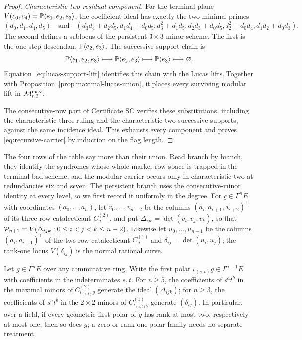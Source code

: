 \begin{proof}
\emph{Characteristic-two residual component.}
For the terminal plane \(V(c_0,c_4)=\mathbb P\langle e_1,e_2,e_3\rangle\), the
coefficient ideal has exactly the two minimal primes
\[
 (d_0,d_1,d_4,d_5)
 \quad\text{and}\quad
 (d_3d_4+d_2d_5,d_1d_4+d_0d_5,d_3^2+d_1d_5,
 d_2d_3+d_0d_5,d_2^2+d_0d_4,d_1d_2+d_0d_3).
\]
The second defines a sublocus of the persistent \(3\times3\)-minor scheme.
The first is the one-step descendant
\(\mathbb P\langle e_2,e_3\rangle\).  The successive support chain is
\[
 \mathbb P\langle e_1,e_2,e_3\rangle
 \longmapsto\mathbb P\langle e_2,e_3\rangle
 \longmapsto\mathbb P\langle e_3\rangle
 \longmapsto\varnothing .
\]
Equation~\eqref{eq:lucas-support-lift} identifies this chain with the Lucas
lifts.  Together with Proposition~\ref{prop:maximal-lucas-union}, it places
every surviving modular lift in \(\mathcal M^{\max}_{r,2}\).

The consecutive-row part of Certificate SC verifies these substitutions,
including the characteristic-three ruling and the
characteristic-two successive supports, against the same incidence ideal.
This exhausts every component and proves \eqref{eq:recursive-carrier} by
induction on the flag length.
\end{proof}

The four rows of the table say more than their union.  Read branch by
branch, they identify the syndromes whose whole marker row space is trapped
in the terminal bad scheme, and the modular carrier occurs only in
characteristic two at redundancies six and seven.  The persistent branch uses
the consecutive-minor identity at every level, so we first record it
uniformly in the degree.  For \(g\in\Gamma^nE\) with coordinates \((a_0,\ldots,a_n)\),
let \(v_0,\ldots,v_{n-2}\) be the columns \((a_i,a_{i+1},a_{i+2})^{\mathsf T}\)
of its three-row catalecticant \(C_g^{(2)}\), and put
\(\Delta_{ijk}=\det(v_i,v_j,v_k)\), so that
\(\mathcal P_{n+1}=V(\Delta_{ijk}:0\leq i<j<k\leq n-2)\).  Likewise let
\(u_0,\ldots,u_{n-1}\) be the columns \((a_i,a_{i+1})^{\mathsf T}\) of the
two-row catalecticant \(C^{(1)}_g\) and \(\delta_{ij}=\det(u_i,u_j)\); the
rank-one locus \(V(\delta_{ij})\) is the normal rational curve.

\begin{lemma}
\label{lem:polar-rank-two}%
%
Let \(g\in\Gamma^nE\) over any commutative ring.  Write the
first polar \(\iota_{(s,t)}g\in\Gamma^{n-1}E\) with coefficients in the
indeterminates \(s,t\).  For \(n\geq5\), the coefficients of \(s^at^b\) in
the maximal minors of \(C^{(2)}_{\iota_{(s,t)}g}\) generate the ideal
\((\Delta_{ijk})\); for \(n\geq3\), the coefficients of \(s^at^b\) in the
\(2\times2\) minors of \(C^{(1)}_{\iota_{(s,t)}g}\) generate
\((\delta_{ij})\).  In particular, over a field, if every geometric first
polar of \(g\) has rank at most two, respectively at most one, then so does
\(g\); a zero or rank-one polar family needs no separate treatment.
\end{lemma}

